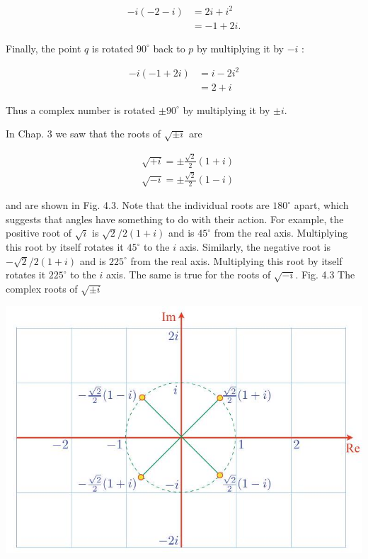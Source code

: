 \documentclass[10pt]{article}
\begin{document}
$$
\begin{aligned}
-i(-2-i) & =2 i+i^{2} \\
& =-1+2 i .
\end{aligned}
$$

Finally, the point $q$ is rotated $90^{\circ}$ back to $p$ by multiplying it by $-i$ :

$$
\begin{aligned}
-i(-1+2 i) & =i-2 i^{2} \\
& =2+i
\end{aligned}
$$

Thus a complex number is rotated $\pm 90^{\circ}$ by multiplying it by $\pm i$.

In Chap. 3 we saw that the roots of $\sqrt{ \pm i}$ are

$$
\begin{aligned}
& \sqrt{+i}= \pm \frac{\sqrt{2}}{2}(1+i) \\
& \sqrt{-i}= \pm \frac{\sqrt{2}}{2}(1-i)
\end{aligned}
$$

and are shown in Fig. 4.3. Note that the individual roots are $180^{\circ}$ apart, which suggests that angles have something to do with their action. For example, the positive root of $\sqrt{i}$ is $\sqrt{2} / 2(1+i)$ and is $45^{\circ}$ from the real axis. Multiplying this root by itself rotates it $45^{\circ}$ to the $i$ axis. Similarly, the negative root is $-\sqrt{2} / 2(1+i)$ and is $225^{\circ}$ from the real axis. Multiplying this root by itself rotates it $225^{\circ}$ to the $i$ axis. The same is true for the roots of $\sqrt{-i}$. Fig. 4.3 The complex roots of $\sqrt{ \pm i}$

\begin{center}
\includegraphics[max width=\textwidth]{2023_04_20_41f1ceac5a31dc7d1b59g-071}
\end{center}
\end{document}
